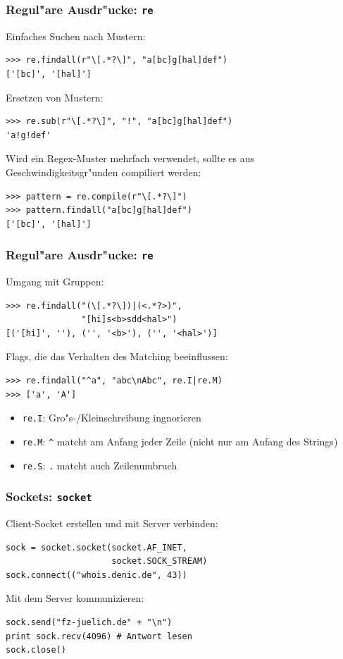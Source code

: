 \begin{frame}[fragile]
\frametitle{Regul"are Ausdr"ucke: \texttt{re}}
Einfaches Suchen nach Mustern:
\begin{lstlisting}[style=Shell]
>>> re.findall(r"\[.*?\]", "a[bc]g[hal]def")
['[bc]', '[hal]']
\end{lstlisting}
\vspace*{2mm}
Ersetzen von Mustern:
\begin{lstlisting}[style=Shell]
>>> re.sub(r"\[.*?\]", "!", "a[bc]g[hal]def")
'a!g!def'
\end{lstlisting}
\vspace*{2mm}
Wird ein Regex-Muster mehrfach verwendet, sollte es aus Geschwindigkeitsgr"unden compiliert werden:
\begin{lstlisting}[style=Shell]
>>> pattern = re.compile(r"\[.*?\]")
>>> pattern.findall("a[bc]g[hal]def")
['[bc]', '[hal]']
\end{lstlisting}
\end{frame}

\begin{frame}[fragile]
\frametitle{Regul"are Ausdr"ucke: \texttt{re}}
Umgang mit Gruppen:
\begin{lstlisting}[style=Shell]
>>> re.findall("(\[.*?\])|(<.*?>)", 
               "[hi]s<b>sdd<hal>")
[('[hi]', ''), ('', '<b>'), ('', '<hal>')]
\end{lstlisting}
\vspace*{2mm}
Flags, die das Verhalten des Matching beeinflussen:
\begin{lstlisting}[style=Shell]
>>> re.findall("^a", "abc\nAbc", re.I|re.M)
>>> ['a', 'A']
\end{lstlisting}
\begin{itemize}
\item \texttt{re.I}: Gro"s-/Kleinschreibung ingnorieren
\item \texttt{re.M}: \lstinline{^} matcht am Anfang jeder Zeile (nicht nur am Anfang des Strings)
\item \texttt{re.S}: \lstinline{.} matcht auch Zeilenumbruch
\end{itemize}
\end{frame}

\begin{frame}[fragile]
\frametitle{Sockets: \texttt{socket}}
Client-Socket erstellen und mit Server verbinden:
\begin{lstlisting}[style=Python]
sock = socket.socket(socket.AF_INET, 
                     socket.SOCK_STREAM)
sock.connect(("whois.denic.de", 43))
\end{lstlisting}
\vspace*{2mm}
Mit dem Server kommunizieren:
\begin{lstlisting}[style=Python]
sock.send("fz-juelich.de" + "\n")
print sock.recv(4096) # Antwort lesen
sock.close()
\end{lstlisting}
\end{frame}

